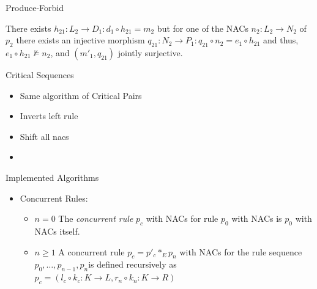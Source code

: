 \documentclass[xcolor=dvipsnames,pdf,11pt,handout]{beamer}
\newcommand{\bi}{\begin{itemize}}
\newcommand{\ei}{\end{itemize}}
\newcommand{\tm}{\item}
\newcommand{\rulesequence}{$p_0,\ldots,p_{n-1},p_n$}
\begin{document}
\begin{frame}[fragile]{Produce-Forbid}{}

\footnotesize
\centerline{
}

\vspace{1cm}

There exists $h_{21}: L_2 \rightarrow D_1 : d_1 \circ h_{21} = m_2$ but for one of the NACs $n_2 : L_2 \rightarrow N_2$ of $p_2$ there exists an injective morphism $q_{21} : N_2 \rightarrow P_1 : q_{21} \circ n_2 = e_1 \circ h_{21}$ and thus, $e_1 \circ h_{21} \nvDash n_2$, and $\left(m'_1,q_{21}\right)$ jointly surjective.

\end{frame}

\begin{frame}{Critical Sequences}{}

\bi
\tm Same algorithm of Critical Pairs
\tm Inverts left rule
\tm Shift all nacs
\tm \footnotesize
\centerline{
}
\ei

\end{frame}

\begin{frame}[fragile]{Implemented Algorithms}{}

\bi
\tm Concurrent Rules:
\begin{itemize}
\item $n = 0$ The \emph{concurrent rule} $p_c$ with NACs for rule $p_0$ with NACs is $p_0$ with NACs itself.
\item $n \geqslant 1$ A concurrent rule $p_c = p'_c \ast_E p_n $ with NACs for the rule sequence \rulesequence is defined recursively as $p_c = (l_c \circ k_c : K \rightarrow L, r_n \circ k_n : K \rightarrow R)$
\end{itemize}
\centerline{
}
\ei
\end{frame}
\end{document}
